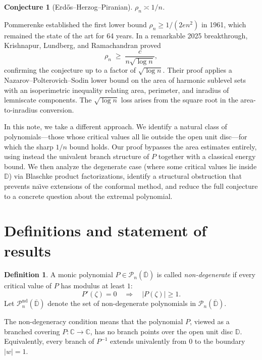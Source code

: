 \documentclass[11pt,a4paper]{amsart}
\newtheorem{conjecture}[theorem]{Conjecture}
\theoremstyle{definition}
\newtheorem{definition}[theorem]{Definition}
\newcommand{\D}{\mathbb{D}}
\newcommand{\C}{\mathbb{C}}
\newcommand{\Pn}{\mathcal{P}_n}
\newcommand{\abs}[1]{\lvert #1 \rvert}
\begin{document}
\begin{conjecture}[Erd\H{o}s--Herzog--Piranian]
$\rho_n \asymp 1/n$.
\end{conjecture}

Pommerenke \cite{Pom61} established the first lower bound
$\rho_n \geq 1/(2en^2)$ in 1961, which remained the state of the art for
64 years.  In a remarkable 2025 breakthrough, Krishnapur, Lundberg, and
Ramachandran \cite{KLR25} proved
\begin{equation}\label{eq:KLR}
  \rho_n \;\geq\; \frac{c}{n\sqrt{\log n}},
\end{equation}
confirming the conjecture up to a factor of $\sqrt{\log n}$.
Their proof applies a Nazarov--Polterovich--Sodin lower bound on the area of
harmonic sublevel sets with an isoperimetric inequality relating area,
perimeter, and inradius of lemniscate components.  The $\sqrt{\log n}$ loss
arises from the square root in the area-to-inradius conversion.

In this note, we take a different approach.  We identify a natural class of
polynomials---those whose critical values all lie outside the open unit
disc---for which the sharp $1/n$ bound holds.  Our proof bypasses the area
estimates entirely, using instead the univalent branch structure of $P$
together with a classical energy bound.  We then analyze the degenerate
case (where some critical values lie inside $\D$) via Blaschke product
factorizations, identify a structural obstruction that prevents na\"{\i}ve
extensions of the conformal method, and reduce the full conjecture to a
concrete question about the extremal polynomial.

\section{Definitions and statement of results}

\begin{definition}
A monic polynomial $P \in \Pn(\overline{\D})$ is called \emph{non-degenerate}
if every critical value of $P$ has modulus at least $1$:
\[
  P'(\zeta) = 0 \quad\Longrightarrow\quad \abs{P(\zeta)} \geq 1.
\]
Let $\Pn^{\mathrm{nd}}(\overline{\D})$ denote the set of non-degenerate
polynomials in $\Pn(\overline{\D})$.
\end{definition}

The non-degeneracy condition means that the polynomial $P$, viewed as a
branched covering $P \colon \C \to \C$, has no branch points over the open
unit disc $\D$.  Equivalently, every branch of $P^{-1}$ extends
univalently from $0$ to the boundary $\abs{w} = 1$.
\end{document}

